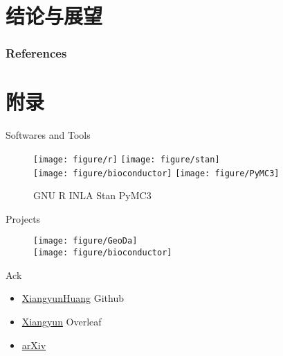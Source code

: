 \documentclass[11pt,compress,xcolor=x11names,UTF8]{beamer}
\begin{document}
\section{结论与展望}

\begin{frame}

\end{frame}



\begin{frame}[allowframebreaks]
\frametitle{References}
\scriptsize


\end{frame}

\appendix

\section*{附录}

\begin{frame}{Softwares and Tools}
\begin{figure}

\centering
\texttt{[image: figure/r]}\qquad
\texttt{[image: figure/stan]} \\ 
\texttt{[image: figure/bioconductor]}
\texttt{[image: figure/PyMC3]} 
\caption{{\color{OrangeRed1} GNU R} {\color{SpringGreen4} INLA}  {\color{OrangeRed1} Stan} {\color{SpringGreen4} PyMC3}}

\end{figure}
\end{frame}



\begin{frame}{Projects}

\begin{figure}
\centering
\texttt{[image: figure/GeoDa]}\\
\texttt{[image: figure/bioconductor]}
\end{figure}

\end{frame}


\begin{frame}{Ack}
\begin{itemize}
\item[\faGithub] \href{https://github.com/XiangyunHuang}{XiangyunHuang} \faAt Github
\item[\aiOverleaf] \href{https://www.overleaf.com/}{Xiangyun} \faAt Overleaf
\item[\aiarXiv] \href{https://arxiv.org/}{arXiv}
\end{itemize}
\end{frame}
\end{document}
